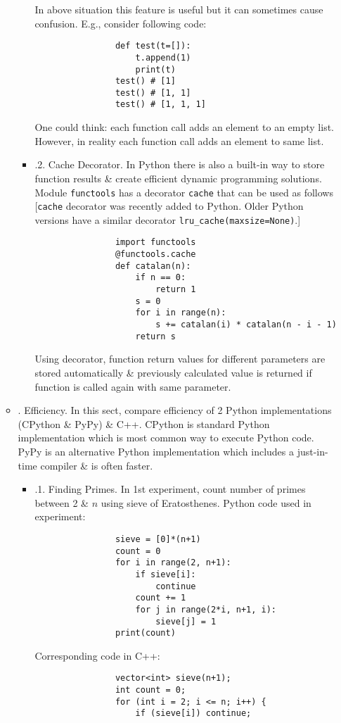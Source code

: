 \documentclass{article}
\begin{document}
\begin{itemize}
\begin{itemize}
\begin{itemize}
			In above situation this feature is useful but it can sometimes cause confusion. E.g., consider following code:
			\begin{verbatim}
				def test(t=[]):
				    t.append(1)
				    print(t)
				test() # [1]
				test() # [1, 1]
				test() # [1, 1, 1]
			\end{verbatim}
			One could think: each function call adds an element to an empty list. However, in reality each function call adds an element to same list.
			\item {.2. Cache Decorator.} In Python there is also a built-in way to store function results \& create efficient dynamic programming solutions. Module {\tt functools} has a decorator {\tt cache} that can be used as follows [{\tt cache} decorator was recently added to Python. Older Python versions have a similar decorator \verb|lru_cache(maxsize=None)|.]
			\begin{verbatim}
				import functools
				@functools.cache
				def catalan(n):
				    if n == 0:
				        return 1
				    s = 0
				    for i in range(n):
				        s += catalan(i) * catalan(n - i - 1)
				    return s
			\end{verbatim}
			Using decorator, function return values for different parameters are stored automatically \& previously calculated value is returned if function is called again with same parameter.
		\end{itemize}
		\item {. Efficiency.} In this sect, compare efficiency of 2 Python implementations (CPython \& PyPy) \& C++. CPython is standard Python implementation which is most common way to execute Python code. PyPy is an alternative Python implementation which includes a just-in-time compiler \& is often faster.
		\begin{itemize}
			\item {.1. Finding Primes.} In 1st experiment, count number of primes between 2 \& $n$ using sieve of Eratosthenes. Python code used in experiment:
			\begin{verbatim}
				sieve = [0]*(n+1)
				count = 0
				for i in range(2, n+1):
				    if sieve[i]:
				        continue
				    count += 1
				    for j in range(2*i, n+1, i):
				        sieve[j] = 1
				print(count)
			\end{verbatim}
			Corresponding code in C++:
			\begin{verbatim}
				vector<int> sieve(n+1);
				int count = 0;
				for (int i = 2; i <= n; i++) {
				    if (sieve[i]) continue;

\end{verbatim}
\end{itemize}
\end{itemize}
\end{itemize}
\end{document}

